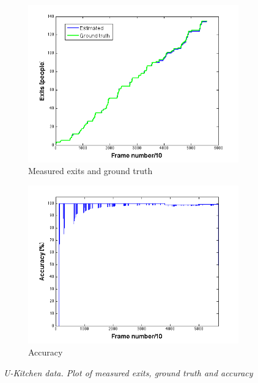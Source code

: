 \begin{figure}[]
\centering
\begin{subfigure}{.5\textwidth}
  \centering
  \includegraphics[width=1.1\linewidth]{images/exitsGTU.png}
  \caption{Measured exits and ground truth}
  \label{fig:sub1}
\end{subfigure}%
\begin{subfigure}{.5\textwidth}
  \centering
  \includegraphics[width=1.1\linewidth]{images/accOutU.png}
  \caption{Accuracy}
  \label{fig:sub2}
\end{subfigure}
\caption[U-kitchen exits]{\textit{U-Kitchen data. Plot of measured exits, ground truth and accuracy}}
\label{fig:U-kitchen exits}
\end{figure}
\newpage

